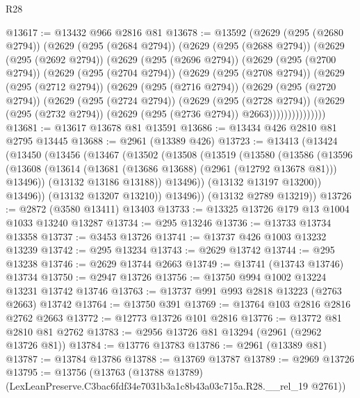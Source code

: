 \begin{lexlean}{R28}
\begin{coremodule}
@13617 := @13432 @966 @2816 @81
@13678 := @13592
    (@2629
      (@295 (@2680 @2794))
      (@2629
        (@295 (@2684 @2794))
        (@2629
          (@295 (@2688 @2794))
          (@2629
            (@295 (@2692 @2794))
            (@2629
              (@295 (@2696 @2794))
              (@2629
                (@295 (@2700 @2794))
                (@2629
                  (@295 (@2704 @2794))
                  (@2629
                    (@295 (@2708 @2794))
                    (@2629
                      (@295 (@2712 @2794))
                      (@2629
                        (@295 (@2716 @2794))
                        (@2629
                          (@295 (@2720 @2794))
                          (@2629
                            (@295 (@2724 @2794))
                            (@2629
                              (@295 (@2728 @2794))
                              (@2629
                                (@295 (@2732 @2794))
                                (@2629 (@295 (@2736 @2794)) @2663)))))))))))))))
@13681 := @13617 @13678 @81 @13591
@13686 := @13434 @426 @2810 @81 @2795 @13445
@13688 := @2961 (@13389 @426)
@13723 := @13413
    (@13424
      (@13450
        (@13456
          (@13467
            (@13502
              (@13508
                (@13519
                  (@13580
                    (@13586
                      (@13596
                        (@13608
                          (@13614 (@13681 (@13686 @13688) (@2961 (@12792 @13678 @81))) @13496))
                        (@13132 @13186 @13188))
                      @13496))
                  (@13132 @13197 @13200))
                @13496))
            (@13132 @13207 @13210))
          @13496))
      (@13132 @2789 @13219))
@13726 := @2872 (@3580 @13411) @13403
@13733 := @13325 @13726 @179 @13 @1004 @1033 @13240 @13287
@13734 := @295 @13246
@13736 := @13733 @13734 @13358
@13737 := @3453 @13726
@13741 := @13737 @426 @1003 @13232 @13239
@13742 := @295 @13234
@13743 := @2629 @13742
@13744 := @295 @13238
@13746 := @2629 @13744 @2663
@13749 := @13741 (@13743 @13746) @13734
@13750 := @2947 @13726
@13756 := @13750 @994 @1002 @13224 @13231 @13742 @13746
@13763 := @13737 @991 @993 @2818 @13223 (@2763 @2663) @13742
@13764 := @13750 @391
@13769 := @13764 @103 @2816 @2816 @2762 @2663
@13772 := @12773 @13726 @101 @2816
@13776 := @13772 @81 @2810 @81 @2762
@13783 := @2956 @13726 @81 @13294 (@2961 (@2962 @13726 @81))
@13784 := @13776 @13783
@13786 := @2961 (@13389 @81)
@13787 := @13784 @13786
@13788 := @13769 @13787
@13789 := @2969 @13726
@13795 := @13756
    (@13763 (@13788 @13789) (LexLeanPreserve.C3bac6fdf34e7031b3a1c8b43a03c715a.R28.__rel_19 @2761))

\end{coremodule}
\end{lexlean}

